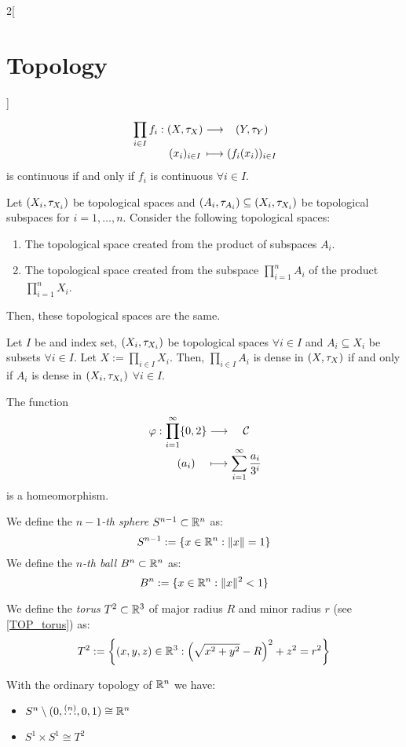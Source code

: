 \documentclass[../../../main.tex]{subfiles}
\begin{document}
\begin{multicols}{2}[\section{Topology}]
\begin{proposition}
    $$
      \function{\displaystyle\prod_{i\in I}f_i}{\left(X,\topo_X\right)}{\left(Y,\topo_Y\right)}{(x_i)_{i\in I}}{(f_i(x_i))_{i\in I}}
    $$ is continuous if and only if $f_i$ is continuous $\forall i\in I$.
  \end{proposition}
  \begin{proposition}
    Let $(X_i,\tau_{X_i})$ be topological spaces and $(A_i,\tau_{A_i})\subseteq (X_i,\tau_{X_i})$ be topological subspaces for $i=1,\ldots, n$. Consider the following topological spaces:
    \begin{enumerate}
      \item The topological space created from the product of subspaces $A_i$.
      \item The topological space created from the subspace $\prod_{i=1}^nA_i$ of the product $\prod_{i=1}^nX_i$.
    \end{enumerate}
    Then, these topological spaces are the same.
  \end{proposition}
  \begin{proposition}
    Let $I$ be and index set, $(X_i,\tau_{X_i})$ be topological spaces $\forall i\in I$ and $A_i\subseteq X_i$ be subsets $\forall i\in I$. Let $X:=\prod_{i\in I}X_i$. Then, $\prod_{i\in I}A_i$ is dense in $(X,\tau_X)$ if and only if $A_i$ is dense in $(X_i,\tau_{X_i})$ $\forall i\in I$.
  \end{proposition}
  \begin{theorem}
    The function
    $$
      \function{\varphi}{\displaystyle\prod_{i=1}^\infty\{0,2\}}{\mathcal{C}}{(a_i)}{\displaystyle\sum_{i=1}^\infty\frac{a_i}{3^i}}
    $$
    is a homeomorphism.
  \end{theorem}
  \begin{definition}
    We define the \emph{$n-1$-th sphere} $S^{n-1}\subset \mathbb{R}^n$ as: $$S^{n-1}:=\{x\in\mathbb{R}^n:\|x\|=1\}$$
    We define the \emph{$n$-th ball} $B^n\subset \mathbb{R}^n$ as: $$B^n:=\{x\in\mathbb{R}^n:\|x\|^2<1\}$$
  \end{definition}
  \begin{definition}[Torus]
    We define the \emph{torus} $T^2\subset \mathbb{R}^3$ of major radius $R$ and minor radius $r$ (see \cref{TOP_torus}) as: $$T^2:=\left\{(x,y,z)\in\mathbb{R}^3:{\left(\sqrt{x^2+y^2}-R\right)}^2+z^2=r^2\right\}$$
  \end{definition}
  \begin{center}
    \begin{minipage}{\linewidth}
      \centering
      
      \label{TOP_torus}
    \end{minipage}
  \end{center}
  \begin{proposition}
    With the ordinary topology of $\mathbb{R}^n$ we have:
    \begin{itemize}
      \item $S^n\setminus(0,\overset{(n)}{\ldots},0,1)\cong\mathbb{R}^n$
      \item $S^1\times S^1\cong T^2$
    \end{itemize}
  \end{proposition}

\end{multicols}
\end{document}
